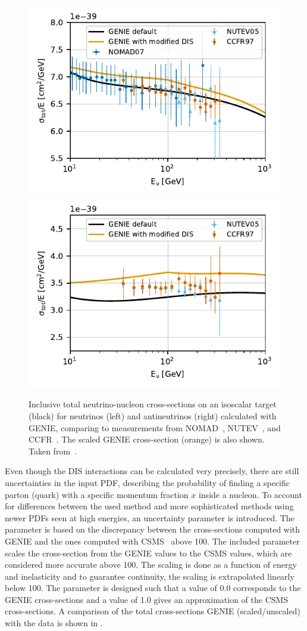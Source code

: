 \begin{figure}
    \centering 
    \includegraphics[width=0.49\linewidth]{figures/simulation_and_processing/cross_sections/NuMu_CC_iso_comp_to_data__upd_style.pdf}
    \includegraphics[width=0.49\linewidth]{figures/simulation_and_processing/cross_sections/NuMu_Bar_CC_iso_comp_to_data__upd_style.pdf}
    
    \caption[Inclusive total neutrino-nucleon cross-sections]{Inclusive total neutrino-nucleon cross-sections on an isoscalar target (black) for neutrinos (left) and antineutrinos (right) calculated with GENIE, comparing to measurements from NOMAD~\cite{xsec_data_nomad}, NUTEV~\cite{xsec_data_nutev}, and CCFR~\cite{xsec_data_ccfr}. The scaled GENIE cross-section (orange) is also shown. Taken from~\cite{OVS_PRD}.}
\end{figure}

Even though the DIS interactions can be calculated very precisely, there are still uncertainties in the input PDF, describing the probability of finding a specific parton (quark) with a specific momentum fraction $x$ inside a nucleon. To account for differences between the used method and more sophisticated methods using newer PDFs seen at high energies, an uncertainty parameter is introduced. The parameter is based on the discrepancy between the cross-sections computed with GENIE and the ones computed with CSMS~ above \SI{100}{\gev}. The included parameter scales the cross-section from the GENIE values to the CSMS values, which are considered more accurate above \SI{100}{\gev}. The scaling is done as a function of energy and inelasticity and to guarantee continuity, the scaling is extrapolated linearly below \SI{100}{\gev}. The parameter is designed such that a value of 0.0 corresponds to the GENIE cross-sections and a value of 1.0 gives an approximation of the CSMS cross-sections. A comparison of the total cross-sections GENIE (scaled/unscaled) with the data is shown in .


